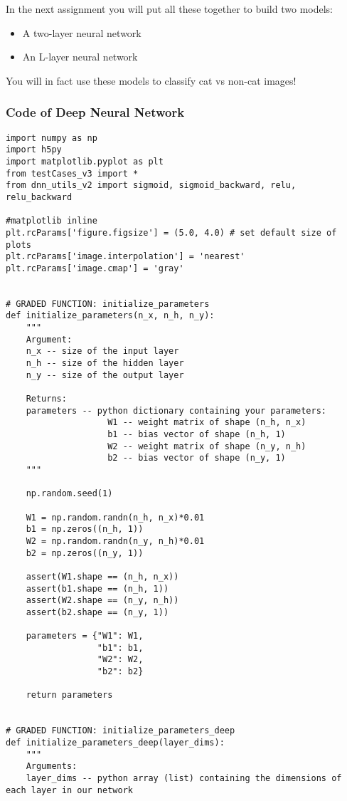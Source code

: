 {In the next assignment you will put all these together to build two models:
\begin{itemize}
\item A two-layer neural network
\item An L-layer neural network
\end{itemize}

You will in fact use these models to classify cat vs non-cat images!



\clearpage
\subsubsection{Code of Deep Neural Network}
\begin{verbatim}
import numpy as np
import h5py
import matplotlib.pyplot as plt
from testCases_v3 import *
from dnn_utils_v2 import sigmoid, sigmoid_backward, relu, relu_backward

#matplotlib inline
plt.rcParams['figure.figsize'] = (5.0, 4.0) # set default size of plots
plt.rcParams['image.interpolation'] = 'nearest'
plt.rcParams['image.cmap'] = 'gray'


# GRADED FUNCTION: initialize_parameters
def initialize_parameters(n_x, n_h, n_y):
    """
    Argument:
    n_x -- size of the input layer
    n_h -- size of the hidden layer
    n_y -- size of the output layer
    
    Returns:
    parameters -- python dictionary containing your parameters:
                    W1 -- weight matrix of shape (n_h, n_x)
                    b1 -- bias vector of shape (n_h, 1)
                    W2 -- weight matrix of shape (n_y, n_h)
                    b2 -- bias vector of shape (n_y, 1)
    """
    
    np.random.seed(1)
    
    W1 = np.random.randn(n_h, n_x)*0.01
    b1 = np.zeros((n_h, 1))
    W2 = np.random.randn(n_y, n_h)*0.01
    b2 = np.zeros((n_y, 1))
    
    assert(W1.shape == (n_h, n_x))
    assert(b1.shape == (n_h, 1))
    assert(W2.shape == (n_y, n_h))
    assert(b2.shape == (n_y, 1))
    
    parameters = {"W1": W1,
                  "b1": b1,
                  "W2": W2,
                  "b2": b2}
    
    return parameters


# GRADED FUNCTION: initialize_parameters_deep
def initialize_parameters_deep(layer_dims):
    """
    Arguments:
    layer_dims -- python array (list) containing the dimensions of each layer in our network
    

\end{verbatim}}
